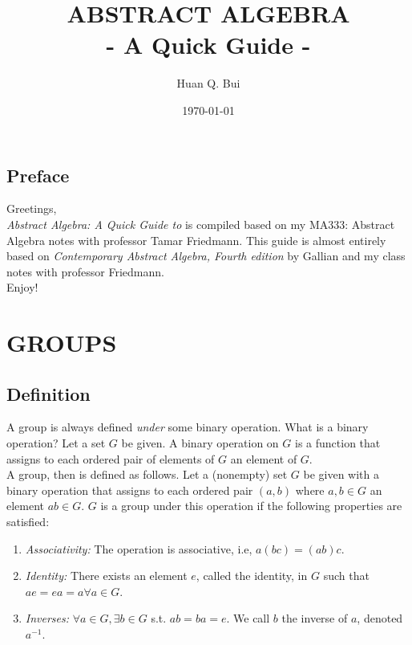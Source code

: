 \documentclass{book}
\theoremstyle{definition}
\begin{document}
	\begin{titlepage}\centering
		\clearpage
		\title{\textsc{\bf{ABSTRACT ALGEBRA}}\\\smallskip - A Quick Guide -\\}
		\author{\bigskip Huan Q. Bui}
		\date{\today}
		\maketitle
		\thispagestyle{empty}
	\end{titlepage}

\newpage

\section*{Preface}

Greetings,\\

\textit{Abstract Algebra: A Quick Guide to} is compiled based on my MA333: Abstract Algebra notes with professor Tamar Friedmann. This guide is almost entirely based on \textit{Contemporary Abstract Algebra, Fourth edition} by Gallian and my class notes with professor Friedmann. \\

Enjoy!


\newpage
\tableofcontents
\newpage

\chapter{GROUPS}


\section{Definition}
A group is always defined \textit{under} some binary operation. What is a binary operation? Let a set $G$ be given. A binary operation on $G$ is a function that assigns to each ordered pair of elements of $G$ an element of $G$. \\

A group, then is defined as follows. Let a (nonempty) set $G$ be given with a binary operation that assigns to each ordered pair $(a,b)$ where $a,b\in G$ an element $ab \in G$. $G$ is a group under this operation if the following properties are satisfied:
\begin{enumerate}
	\item \textit{Associativity:} The operation is associative, i.e, $a(bc) = (ab)c$.
	\item \textit{Identity:} There exists an element $e$, called the identity, in $G$ such that $ae = ea = a \forall a \in G$. 
	\item \textit{Inverses:} $\forall a \in G, \exists b \in G$ s.t. $ab = ba  =e$. We call $b$ the inverse of $a$, denoted $a^{-1}$. 
\end{enumerate}
\end{document}
